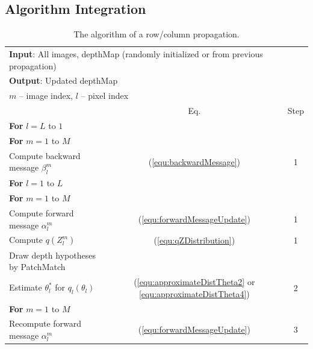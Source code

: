 \subsection{Algorithm Integration}  \label{sec:algorithm}
\begin{table}
    \small
    \centering
    \begin{tabular}{|l|c|c|}
        \hline
        \multicolumn{3}{|p{13.0cm}|}{{\bf Input}: All images, depthMap (randomly initialized or from previous propagation)}  \\
        \multicolumn{3}{|p{13.0cm}|}{{\bf Output}: Updated depthMap}\\
        \multicolumn{3}{|p{13.0cm}|}{$m$ -- image index, $l$ -- pixel index}\\
        \hline
            & Eq. & Step \\ \cline{2-3}
            {\bf For} $l = L$ to $1$ & &\\
                \hspace{5 mm} {\bf For} $m = 1$ to $M$  & & \\
                    \hspace{10 mm} Compute backward message $\beta_l^m$  &    (\ref{equ:backwardMessage}) &   1 \\
            {\bf For} $l = 1$ to $L$ & &\\
                \hspace{5 mm} {\bf For} $m = 1$ to $M$ & &\\
                  \hspace{10 mm} Compute forward message $\alpha_l^m$  &      (\ref{equ:forwardMessageUpdate}) & 1\\
                  \hspace{10 mm} Compute $q(Z_l^m)$                    &    (\ref{equ:qZDistribution}) & 1\\
                \hspace{5 mm} Draw depth hypotheses by PatchMatch & &\\
                \hspace{5 mm} Estimate $\theta_l^*$ for $q_l(\theta_l)$ &   (\ref{equ:approximateDistTheta2} or \ref{equ:approximateDistTheta4})& 2\\
                \hspace{5 mm} {\bf For} $m = 1$ to $M$  & &\\
                  \hspace{10 mm} Recompute forward message $\alpha_l^m$ & (\ref{equ:forwardMessageUpdate}) & 3\\
        \hline
    \end{tabular}
\caption[Algorithm of a row/column propagation for joint view selection and depth estimation.]{The algorithm of a row/column propagation.}
\label{table:algorithm}
\end{table}

